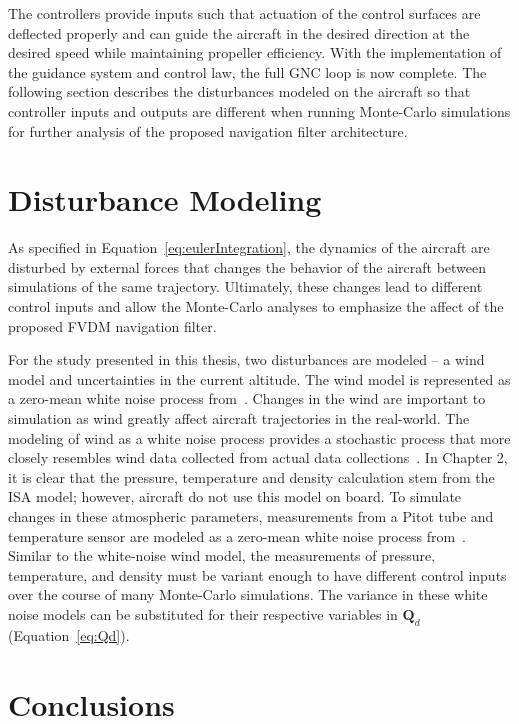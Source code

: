 The controllers provide inputs such that actuation of the control surfaces are deflected properly and can guide the aircraft in the desired direction at the desired speed while maintaining propeller efficiency. With the implementation of the guidance system and control law, the full GNC loop is now complete. The following section describes the disturbances modeled on the aircraft so that controller inputs and outputs are different when running Monte-Carlo simulations for further analysis of the proposed navigation filter architecture.

\section{\textbf{Disturbance Modeling}}

As specified in Equation~\ref{eq:eulerIntegration}, the dynamics of the aircraft are disturbed by external forces that changes the behavior of the aircraft between simulations of the same trajectory. Ultimately, these changes lead to different control inputs and allow the Monte-Carlo analyses to emphasize the affect of the proposed FVDM navigation filter.

For the study presented in this thesis, two disturbances are modeled {--} a wind model and uncertainties in the current altitude. The wind model is represented as a zero-mean white noise process from~\cite{khaghaniAutonomousVehicleDynamic2016}. Changes in the wind are important to simulation as wind greatly affect aircraft trajectories in the real-world. The modeling of wind as a white noise process provides a stochastic process that more closely resembles wind data collected from actual data collections~\cite{mwenegohaModelbasedTightlyCoupled2020}. In Chapter 2, it is clear that the pressure, temperature and density calculation stem from the ISA model; however, aircraft do not use this model on board. To simulate changes in these atmospheric parameters, measurements from a Pitot tube and temperature sensor are modeled as a zero-mean white noise process from~\cite{pieniazekDynamicResponsePitot2023}. Similar to the white-noise wind model, the measurements of pressure, temperature, and density must be variant enough to have different control inputs over the course of many Monte-Carlo simulations. The variance in these white noise models can be substituted for their respective variables in \(\mathbf{Q}_d\) (Equation~\ref{eq:Qd}).

\section{\textbf{Conclusions}}

